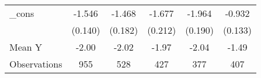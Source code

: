 {\begin{tabular}{l*{5}{c}}
\addlinespace
\_cons      &      -1.546\sym{***}&      -1.468\sym{***}&      -1.677\sym{***}&      -1.964\sym{***}&      -0.932\sym{***}\\
            &     (0.140)         &     (0.182)         &     (0.212)         &     (0.190)         &     (0.133)         \\
\midrule
Mean Y      &       -2.00         &       -2.02         &       -1.97         &       -2.04         &       -1.49         \\
Observations&         955         &         528         &         427         &         377         &         407         \\
\bottomrule
\end{tabular}
}

